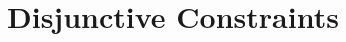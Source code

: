 \documentclass[demotion-paper]{subfiles}
\begin{document}
\section{Disjunctive Constraints}
\label{sec:disj}
\end{document}
